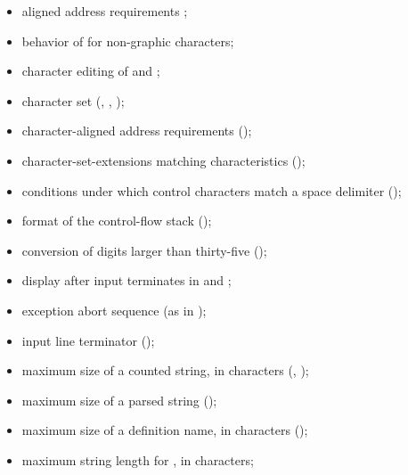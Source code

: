 \begin{itemize}
\item aligned address requirements ;

\item behavior of  for non-graphic characters;

\item character editing of  and
	;

\item character set (,
	, );

\item character-aligned address requirements
	();

\item character-set-extensions matching characteristics
	();

\item conditions under which control characters match a space
	delimiter ();

\item format of the control-flow stack
	();

\item conversion of digits larger than thirty-five
	();

\item display after input terminates in 
	and ;

\item exception abort sequence (as in );

\item input line terminator ();

\item maximum size of a counted string, in characters
	(, );

\item maximum size of a parsed string
	();

\item maximum size of a definition name, in characters
	();

\item maximum string length for
	, in characters;


\end{itemize}
